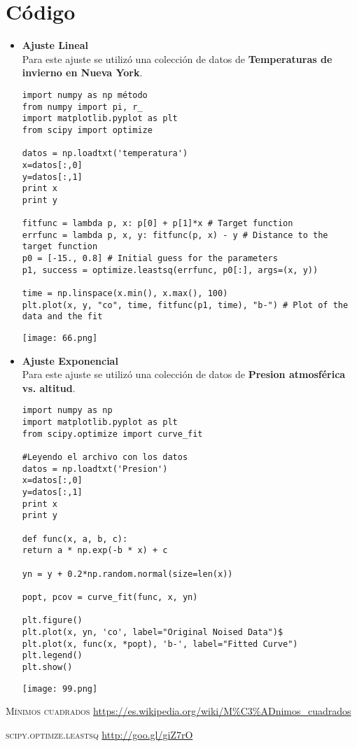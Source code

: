 \documentclass[a4paper]{article}
\begin{document}
\section{Código}
\begin{itemize}
\item \textbf{Ajuste Lineal} \\ 
Para este ajuste se utilizó una colección de datos de \textbf{Temperaturas de invierno en Nueva York}.

\begin{verbatim}
import numpy as np método 
from numpy import pi, r_
import matplotlib.pyplot as plt
from scipy import optimize

datos = np.loadtxt('temperatura')
x=datos[:,0]
y=datos[:,1]
print x
print y

fitfunc = lambda p, x: p[0] + p[1]*x # Target function
errfunc = lambda p, x, y: fitfunc(p, x) - y # Distance to the target function
p0 = [-15., 0.8] # Initial guess for the parameters
p1, success = optimize.leastsq(errfunc, p0[:], args=(x, y))

time = np.linspace(x.min(), x.max(), 100)
plt.plot(x, y, "co", time, fitfunc(p1, time), "b-") # Plot of the data and the fit
\end{verbatim}

\begin{center}
\texttt{[image: 66.png]}
\end{center}

\item \textbf{Ajuste Exponencial} \\ 
Para este ajuste se utilizó una colección de datos de \textbf{Presion atmosférica vs. altitud}.
\begin{verbatim}
import numpy as np
import matplotlib.pyplot as plt
from scipy.optimize import curve_fit

#Leyendo el archivo con los datos
datos = np.loadtxt('Presion')
x=datos[:,0]
y=datos[:,1]
print x
print y

def func(x, a, b, c):
return a * np.exp(-b * x) + c

yn = y + 0.2*np.random.normal(size=len(x))

popt, pcov = curve_fit(func, x, yn)

plt.figure()
plt.plot(x, yn, 'co', label="Original Noised Data")$
plt.plot(x, func(x, *popt), 'b-', label="Fitted Curve")
plt.legend()
plt.show()
\end{verbatim}

\begin{center}
	\texttt{[image: 99.png]}
\end{center}


\end{itemize}


\begin{thebibliography}{99}
	\textsc{Mínimos cuadrados}
	\url{https://es.wikipedia.org/wiki/M%C3%ADnimos_cuadrados}
		
	\textsc{scipy.optimze.leastsq}
	\url{http://goo.gl/giZ7rO}

\end{thebibliography}
\end{document}
